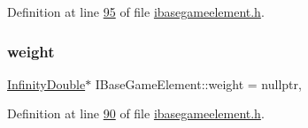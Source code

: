 Definition at line \hyperlink{a00047_source_l00095}{95} of file \hyperlink{a00047_source}{ibasegameelement.\+h}.

\mbox{\label{a00137_a99901016531fd27b9b197dc88d3bfa4a}} 
\subsubsection{\texorpdfstring{weight}{weight}}
{\footnotesize\ttfamily \hyperlink{a00161}{Infinity\+Double}$\ast$ I\+Base\+Game\+Element\+::weight = nullptr\hspace{0.3cm}{\ttfamily [protected]}, {\ttfamily [inherited]}}



Definition at line \hyperlink{a00047_source_l00090}{90} of file \hyperlink{a00047_source}{ibasegameelement.\+h}.

